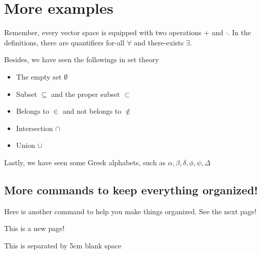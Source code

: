 \documentclass{article}
\begin{document}
\section{More examples}

Remember, every vector space is equipped with two operations $+$ and $\cdot$. In the definitions, there are quantifiers for-all $\forall$ and there-exists $\exists$.

Besides, we have seen the followings in set theory
\begin{itemize}
    \item The empty set $\emptyset$
    \item Subset $\subseteq$ and the proper subset $\subset$
    \item Belongs to $\in$ and not belongs to $\notin$
    \item Intersection $\cap$
    \item Union $\cup$
\end{itemize}

Lastly, we have seen some Greek alphabets, such as
$\alpha, \beta, \delta, \phi, \psi, \Delta$

\subsection{More commands to keep everything organized!}

Here is another command to help you make things organized. See the next page!

\newpage

This is a new page!

\vspace*{5cm}

This is separated by 5cm blank space
    
\end{document}
